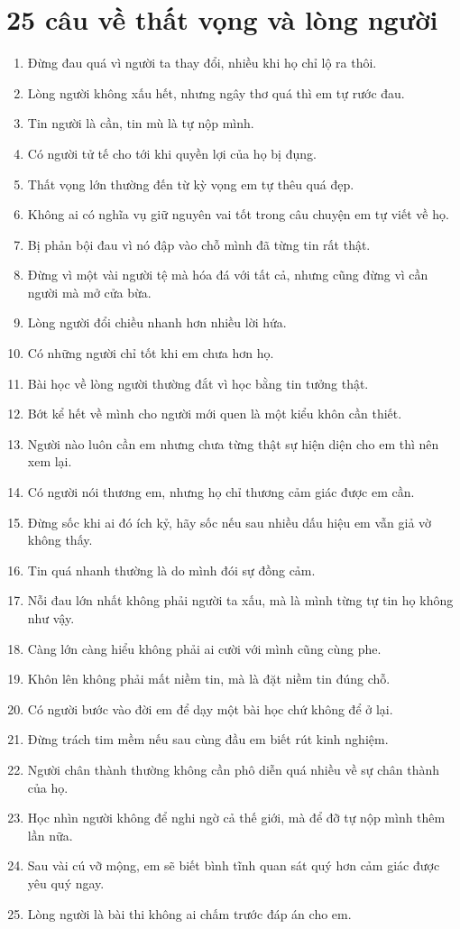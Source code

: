 \section{25 câu về thất vọng và lòng người}
\begin{enumerate}[leftmargin=*,resume]
\item Đừng đau quá vì người ta thay đổi, nhiều khi họ chỉ lộ ra thôi.
\item Lòng người không xấu hết, nhưng ngây thơ quá thì em tự rước đau.
\item Tin người là cần, tin mù là tự nộp mình.
\item Có người tử tế cho tới khi quyền lợi của họ bị đụng.
\item Thất vọng lớn thường đến từ kỳ vọng em tự thêu quá đẹp.
\item Không ai có nghĩa vụ giữ nguyên vai tốt trong câu chuyện em tự viết về họ.
\item Bị phản bội đau vì nó đập vào chỗ mình đã từng tin rất thật.
\item Đừng vì một vài người tệ mà hóa đá với tất cả, nhưng cũng đừng vì cần người mà mở cửa bừa.
\item Lòng người đổi chiều nhanh hơn nhiều lời hứa.
\item Có những người chỉ tốt khi em chưa hơn họ.
\item Bài học về lòng người thường đắt vì học bằng tin tưởng thật.
\item Bớt kể hết về mình cho người mới quen là một kiểu khôn cần thiết.
\item Người nào luôn cần em nhưng chưa từng thật sự hiện diện cho em thì nên xem lại.
\item Có người nói thương em, nhưng họ chỉ thương cảm giác được em cần.
\item Đừng sốc khi ai đó ích kỷ, hãy sốc nếu sau nhiều dấu hiệu em vẫn giả vờ không thấy.
\item Tin quá nhanh thường là do mình đói sự đồng cảm.
\item Nỗi đau lớn nhất không phải người ta xấu, mà là mình từng tự tin họ không như vậy.
\item Càng lớn càng hiểu không phải ai cười với mình cũng cùng phe.
\item Khôn lên không phải mất niềm tin, mà là đặt niềm tin đúng chỗ.
\item Có người bước vào đời em để dạy một bài học chứ không để ở lại.
\item Đừng trách tim mềm nếu sau cùng đầu em biết rút kinh nghiệm.
\item Người chân thành thường không cần phô diễn quá nhiều về sự chân thành của họ.
\item Học nhìn người không để nghi ngờ cả thế giới, mà để đỡ tự nộp mình thêm lần nữa.
\item Sau vài cú vỡ mộng, em sẽ biết bình tĩnh quan sát quý hơn cảm giác được yêu quý ngay.
\item Lòng người là bài thi không ai chấm trước đáp án cho em.
\end{enumerate}

